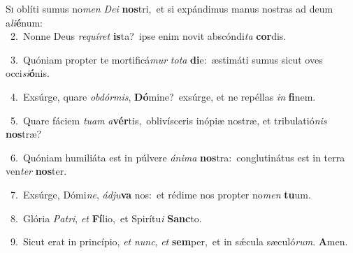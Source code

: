 \lettrine{\initial\textcolor{\initialcolor}{S}}{i} oblíti sumus no\textit{men} \textit{De}\-\textit{i} \textbf{nos}\-tri,~\star et si expándimus manus nostras ad deum a\-\textit{li}\-\textbf{é}num:\\
{\numbfont\textcolor{\numbcolor}{~2.}}~Nonne Deus \textit{re}\-\textit{quí}\textit{ret} \textbf{is}\-ta?~\star ipse enim novit abscóndi\textit{ta} \textbf{cor}\-dis.\par
{\numbfont\textcolor{\numbcolor}{~3.}}~Quóniam propter te mortificá\textit{mur} \textit{to}\-\textit{ta} \textbf{di}\-e:~\star æstimáti sumus sicut oves occi\-\textit{si}\-\textbf{ó}nis.\par
{\numbfont\textcolor{\numbcolor}{~4.}}~Exsúrge, quare \textit{ob}\-\textit{dór}\textit{mis}, \textbf{Dó}\-mine?~\star exsúrge, et ne repéllas \textit{in} \textbf{fi}\-nem.\par
{\numbfont\textcolor{\numbcolor}{~5.}}~Quare fáciem \textit{tu}\-\textit{am} \textit{a}\-\textbf{vér}tis,~\star oblivísceris inópiæ nostræ, et tribulatió\textit{nis} \textbf{nos}\-træ?\par
{\numbfont\textcolor{\numbcolor}{~6.}}~Quóniam humiliáta est in púlvere \textit{á}\-\textit{ni}\textit{ma} \textbf{nos}\-tra:~\star conglutinátus est in terra ven\textit{ter} \textbf{nos}\-ter.\par
{\numbfont\textcolor{\numbcolor}{~7.}}~Exsúrge, Dómi\-\textit{ne}\-, \textit{ád}\-\textit{ju}\textbf{va} nos:~\star et rédime nos propter no\textit{men} \textbf{tu}\-um.\par
{\numbfont\textcolor{\numbcolor}{~8.}}~Glória \textit{Pa}\-\textit{tri}, \textit{et} \textbf{Fí}\-lio,~\star et Spirítu\textit{i} \textbf{Sanc}\-to.\par
{\numbfont\textcolor{\numbcolor}{~9.}}~Sicut erat in princípio, \textit{et} \textit{nunc}\-, \textit{et} \textbf{sem}\-per,~\star et in sǽcula sæculó\-\textit{rum}\-. \textbf{A}\-men.\par
